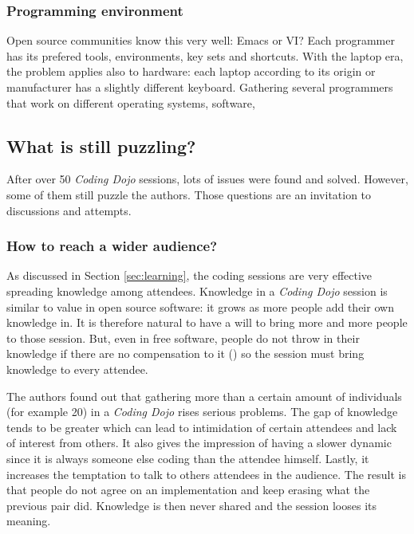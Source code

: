 \subsubsection{Programming environment}

Open source communities know this very well: Emacs or VI? Each
programmer has its prefered tools, environments, key sets and
shortcuts. With the laptop era, the problem applies also to hardware:
each laptop according to its origin or manufacturer has a slightly
different keyboard. Gathering several programmers that work on different operating systems, software, 

\subsection{What is still puzzling?}\label{ssub:puzzles}

After over 50 \textit{Coding Dojo} sessions, lots of issues were found
and solved. However, some of them still puzzle the authors. Those
questions are an invitation to discussions and attempts.

\subsubsection{How to reach a wider audience?}

As discussed in Section \ref{sec:learning}, the coding sessions
are very effective spreading knowledge among attendees. Knowledge in a
\textit{Coding Dojo} session is similar to value in open source
software: it grows as more people add their own knowledge in. It is
therefore natural to have a will to bring more and more people to
those session. But, even in free software, people do not throw in
their knowledge if there are no compensation to it
(\cite{RishabGhosh}) so the session must bring knowledge to every
attendee.

The authors found out that gathering more than a certain amount of
individuals (for example 20) in a \textit{Coding Dojo} rises serious
problems. The gap of knowledge tends to be greater which can lead to
intimidation of certain attendees and lack of interest from others. It
also gives the impression of having a slower dynamic since it is
always someone else coding than the attendee himself. Lastly, it
increases the temptation to talk to others attendees in the
audience. The result is that people do not agree on an implementation
and keep erasing what the previous pair did. Knowledge is then never
shared and the session looses its meaning.

